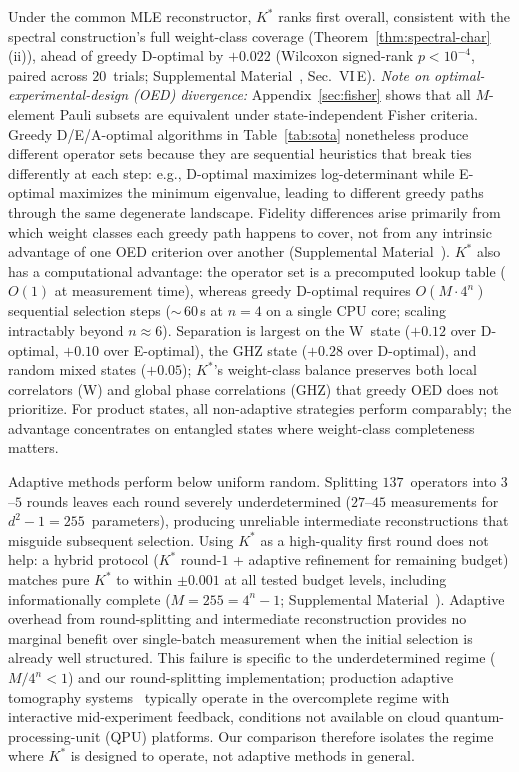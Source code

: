 \documentclass[twocolumn,prx,aps,superscriptaddress,longbibliography,floatfix]{revtex4-2}
\begin{document}
Under the common MLE reconstructor, $K^*$ ranks first overall,
consistent with the spectral construction's full weight-class
coverage (Theorem~\ref{thm:spectral-char}(ii)),
ahead of greedy D-optimal by $+0.022$
(Wilcoxon signed-rank $p < 10^{-4}$, paired across $20$~trials;
Supplemental Material~\cite{supplemental}, Sec.~VI\,E).
\emph{Note on optimal-experimental-design (OED) divergence:}
Appendix~\ref{sec:fisher} shows that all $M$-element Pauli subsets
are equivalent under state-independent Fisher criteria.
Greedy D/E/A-optimal algorithms in Table~\ref{tab:sota}
nonetheless produce different operator sets because they are
sequential heuristics that break ties differently at each step:
e.g., D-optimal maximizes log-determinant while E-optimal
maximizes the minimum eigenvalue, leading to different greedy
paths through the same degenerate landscape.
Fidelity differences arise primarily from which
weight classes each greedy path happens to cover,
not from any intrinsic advantage of one OED criterion over
another (Supplemental Material~\cite{supplemental}).
$K^*$ also has a computational advantage: the operator set is a
precomputed lookup table ($O(1)$ at measurement time), whereas
greedy D-optimal requires $O(M \cdot 4^n)$ sequential selection
steps (${\sim}\,60$\,s at $n = 4$ on a single CPU core; scaling intractably beyond $n \approx 6$).
Separation is largest on the W~state ($+0.12$ over D-optimal,
$+0.10$ over E-optimal), the GHZ state ($+0.28$ over D-optimal),
and random mixed states ($+0.05$); $K^*$'s weight-class balance
preserves both local correlators (W) and global phase correlations
(GHZ) that greedy OED does not prioritize.
For product states, all non-adaptive strategies perform comparably;
the advantage concentrates on entangled states where weight-class
completeness matters.

Adaptive methods perform below uniform random.
Splitting $137$~operators into $3$--$5$ rounds
leaves each round severely underdetermined
($27$--$45$ measurements for $d^2 - 1 = 255$~parameters),
producing unreliable intermediate reconstructions that
misguide subsequent selection.
Using $K^*$ as a high-quality first round does not help:
a hybrid protocol ($K^*$ round-$1$ + adaptive refinement
for remaining budget) matches pure $K^*$ to within
$\pm 0.001$ at all tested budget levels, including
informationally complete ($M = 255 = 4^n - 1$;
Supplemental Material~\cite{supplemental}).
Adaptive overhead from round-splitting and intermediate
reconstruction provides no marginal benefit over
single-batch measurement when the initial selection is
already well structured.
This failure is specific to the underdetermined regime
($M/4^n < 1$) and our round-splitting implementation;
production adaptive tomography systems~\cite{Huszar2012}
typically operate in the overcomplete regime with
interactive mid-experiment feedback, conditions not
available on cloud quantum-processing-unit (QPU) platforms.
Our comparison therefore isolates the regime where $K^*$
is designed to operate, not adaptive methods in general.
\end{document}
